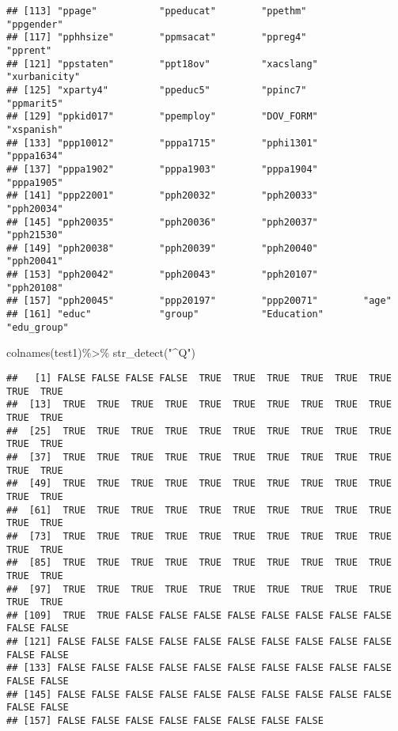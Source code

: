 \documentclass[
]{article}
\newenvironment{Shaded}{\begin{snugshade}}{\end{snugshade}}
\newcommand{\FunctionTok}[1]{\textcolor[rgb]{0.00,0.00,0.00}{#1}}
\newcommand{\NormalTok}[1]{#1}
\newcommand{\SpecialCharTok}[1]{\textcolor[rgb]{0.00,0.00,0.00}{#1}}
\newcommand{\StringTok}[1]{\textcolor[rgb]{0.31,0.60,0.02}{#1}}
\begin{document}
\begin{verbatim}
## [113] "ppage"           "ppeducat"        "ppethm"          "ppgender"       
## [117] "pphhsize"        "ppmsacat"        "ppreg4"          "pprent"         
## [121] "ppstaten"        "ppt18ov"         "xacslang"        "xurbanicity"    
## [125] "xparty4"         "ppeduc5"         "ppinc7"          "ppmarit5"       
## [129] "ppkid017"        "ppemploy"        "DOV_FORM"        "xspanish"       
## [133] "ppp10012"        "pppa1715"        "pphi1301"        "pppa1634"       
## [137] "pppa1902"        "pppa1903"        "pppa1904"        "pppa1905"       
## [141] "ppp22001"        "pph20032"        "pph20033"        "pph20034"       
## [145] "pph20035"        "pph20036"        "pph20037"        "pph21530"       
## [149] "pph20038"        "pph20039"        "pph20040"        "pph20041"       
## [153] "pph20042"        "pph20043"        "pph20107"        "pph20108"       
## [157] "pph20045"        "ppp20197"        "ppp20071"        "age"            
## [161] "educ"            "group"           "Education"       "edu_group"
\end{verbatim}

\begin{Shaded}
\begin{Highlighting}[]
\FunctionTok{colnames}\NormalTok{(test1)}\SpecialCharTok{\%\textgreater{}\%}
  \FunctionTok{str\_detect}\NormalTok{(}\StringTok{"\^{}Q"}\NormalTok{)}
\end{Highlighting}
\end{Shaded}

\begin{verbatim}
##   [1] FALSE FALSE FALSE FALSE  TRUE  TRUE  TRUE  TRUE  TRUE  TRUE  TRUE  TRUE
##  [13]  TRUE  TRUE  TRUE  TRUE  TRUE  TRUE  TRUE  TRUE  TRUE  TRUE  TRUE  TRUE
##  [25]  TRUE  TRUE  TRUE  TRUE  TRUE  TRUE  TRUE  TRUE  TRUE  TRUE  TRUE  TRUE
##  [37]  TRUE  TRUE  TRUE  TRUE  TRUE  TRUE  TRUE  TRUE  TRUE  TRUE  TRUE  TRUE
##  [49]  TRUE  TRUE  TRUE  TRUE  TRUE  TRUE  TRUE  TRUE  TRUE  TRUE  TRUE  TRUE
##  [61]  TRUE  TRUE  TRUE  TRUE  TRUE  TRUE  TRUE  TRUE  TRUE  TRUE  TRUE  TRUE
##  [73]  TRUE  TRUE  TRUE  TRUE  TRUE  TRUE  TRUE  TRUE  TRUE  TRUE  TRUE  TRUE
##  [85]  TRUE  TRUE  TRUE  TRUE  TRUE  TRUE  TRUE  TRUE  TRUE  TRUE  TRUE  TRUE
##  [97]  TRUE  TRUE  TRUE  TRUE  TRUE  TRUE  TRUE  TRUE  TRUE  TRUE  TRUE  TRUE
## [109]  TRUE  TRUE FALSE FALSE FALSE FALSE FALSE FALSE FALSE FALSE FALSE FALSE
## [121] FALSE FALSE FALSE FALSE FALSE FALSE FALSE FALSE FALSE FALSE FALSE FALSE
## [133] FALSE FALSE FALSE FALSE FALSE FALSE FALSE FALSE FALSE FALSE FALSE FALSE
## [145] FALSE FALSE FALSE FALSE FALSE FALSE FALSE FALSE FALSE FALSE FALSE FALSE
## [157] FALSE FALSE FALSE FALSE FALSE FALSE FALSE FALSE
\end{verbatim}
\end{document}
